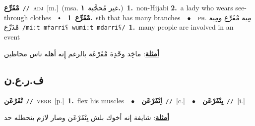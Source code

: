 \documentclass[10pt,a4paper,twoside]{article} %
\begin{document}
\begin{multicols}{2}
{\setlength\topsep{0pt}\textbf{\foreignlanguage{arabic}{مْفَرِّع}}\ {\color{gray}\texttt{//}\color{black}}\ \textsc{adj}\ [m.]\ \color{gray}(msa. \foreignlanguage{arabic}{غير مُحجَّبة}~\foreignlanguage{arabic}{\textbf{١.}})\color{black}\ \textbf{1.}~non-Hijabi  \textbf{2.}~a lady who wears see-through clothes\ \ $\smblkdiamond$\ \ \setlength\topsep{0pt}\textbf{\foreignlanguage{arabic}{مْفَرِّع}}\ \textbf{1.}~sth that has many branches\ \ $\bullet$\ \ \textsc{ph.} \color{gray} \foreignlanguage{arabic}{مِية مْفَرِّع ومِية مْدَرِّع}\color{black}\ {\color{gray}\texttt{/{\sffamily miːt mfarriʕ wumiːt mdarriʕ}/}\color{black}}\ \textbf{1.}~many people are involved in an event\  \begin{flushright}\color{gray}\foreignlanguage{arabic}{\textbf{\underline{\foreignlanguage{arabic}{أمثلة}}}: ماخِد وحْدِة مْفَرْعَة بالرغم إِنه أهله ناس محاظين}\end{flushright}\color{black}} \vspace{2mm}

\vspace{-3mm}
\subsection*{\color{blue}\foreignlanguage{arabic}{ف.ر.ع.ن}\color{blue}{}} 

{\setlength\topsep{0pt}\textbf{\foreignlanguage{arabic}{تْفَرْعَن}}\ {\color{gray}\texttt{//}\color{black}}\ \textsc{verb}\ [p.]\ \textbf{1.}~flex his muscles\ \ $\bullet$\ \ \setlength\topsep{0pt}\textbf{\foreignlanguage{arabic}{اِتْفَرْعَن}}\ {\color{gray}\texttt{//}\color{black}}\ [c.]\ \ $\bullet$\ \ \setlength\topsep{0pt}\textbf{\foreignlanguage{arabic}{يِتْفَرْعَن}}\ {\color{gray}\texttt{//}\color{black}}\ [i.]\  \begin{flushright}\color{gray}\foreignlanguage{arabic}{\textbf{\underline{\foreignlanguage{arabic}{أمثلة}}}: شايفة إنه أخوك بلش يِتْفَرْعَن وصار لازم ينحطله حد}\end{flushright}\color{black}} \vspace{2mm}


\end{multicols}
\end{document}
